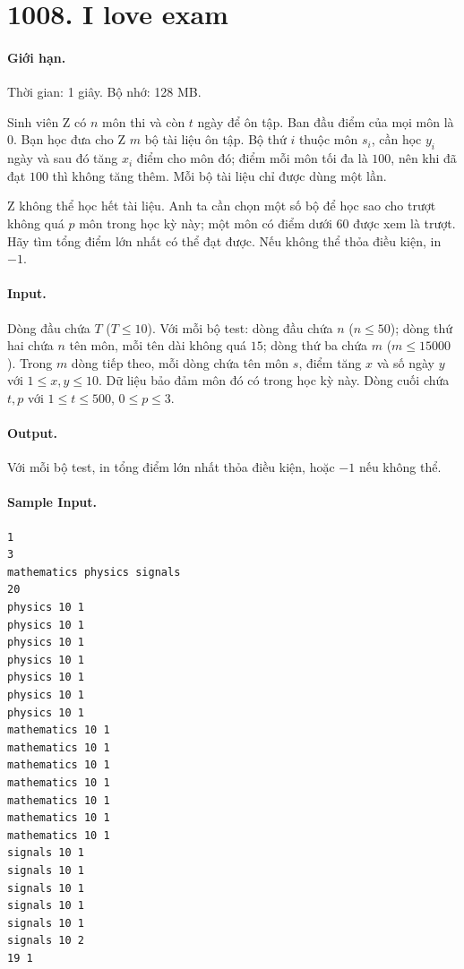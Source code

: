 \documentclass[11pt]{article}
\begin{document}
\section{1008. I love exam}

\paragraph{Giới hạn.} Thời gian: 1 giây. Bộ nhớ: 128 MB.

Sinh viên Z có $n$ môn thi và còn $t$ ngày để ôn tập.  Ban đầu điểm của mọi môn
là $0$.  Bạn học đưa cho Z $m$ bộ tài liệu ôn tập.  Bộ thứ $i$ thuộc môn
$s_i$, cần học $y_i$ ngày và sau đó tăng $x_i$ điểm cho môn đó; điểm mỗi môn
tối đa là $100$, nên khi đã đạt $100$ thì không tăng thêm.  Mỗi bộ tài liệu chỉ
được dùng một lần.

Z không thể học hết tài liệu.  Anh ta cần chọn một số bộ để học sao cho trượt
không quá $p$ môn trong học kỳ này; một môn có điểm dưới $60$ được xem là
trượt.  Hãy tìm tổng điểm lớn nhất có thể đạt được.  Nếu không thể thỏa điều
kiện, in $-1$.

\paragraph{Input.}
Dòng đầu chứa $T$ ($T\le 10$).  Với mỗi bộ test: dòng đầu chứa $n$ ($n\le 50$);
dòng thứ hai chứa $n$ tên môn, mỗi tên dài không quá $15$; dòng thứ ba chứa
$m$ ($m\le 15000$).  Trong $m$ dòng tiếp theo, mỗi dòng chứa tên môn $s$, điểm
tăng $x$ và số ngày $y$ với $1\le x,y\le 10$.  Dữ liệu bảo đảm môn đó có trong
học kỳ này.  Dòng cuối chứa $t,p$ với $1\le t\le 500$, $0\le p\le 3$.

\paragraph{Output.}
Với mỗi bộ test, in tổng điểm lớn nhất thỏa điều kiện, hoặc $-1$ nếu không thể.

\paragraph{Sample Input.}
\begin{verbatim}
1
3
mathematics physics signals
20
physics 10 1
physics 10 1
physics 10 1
physics 10 1
physics 10 1
physics 10 1
physics 10 1
mathematics 10 1
mathematics 10 1
mathematics 10 1
mathematics 10 1
mathematics 10 1
mathematics 10 1
mathematics 10 1
signals 10 1
signals 10 1
signals 10 1
signals 10 1
signals 10 1
signals 10 2
19 1
\end{verbatim}
\end{document}
